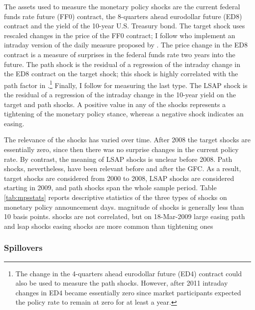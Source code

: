 {The assets used to measure the monetary policy shocks are the current federal funds rate future (FF0) contract, the 8-quarters ahead eurodollar future (ED8) contract and the yield of the 10-year U.S. Treasury bond.
The target shock uses rescaled changes in the price of the FF0 contract; I follow \cite{GSS:2005a} who implement an intraday version of the daily measure proposed by \cite{Kuttner:2001}.
The price change in the ED8 contract is a measure of surprises in the federal funds rate two years into the future.
The path shock is the residual of a regression of the intraday change in the ED8 contract on the target shock; this shock is highly correlated with the path factor in \cite{GSS:2005a}.\footnote{ The change in the 4-quarters ahead eurodollar future (ED4) contract could also be used to measure the path shocks. However, after 2011 intraday changes in ED4 became essentially zero since market participants expected the policy rate to remain at zero for at least a year.}
Finally, I follow \cite{Swanson:2018} for measuring the last type. %
The LSAP shock is the residual of a regression of the intraday change in the 10-year yield on the target and path shocks.
A positive value in any of the shocks represents a tightening of the monetary policy stance, whereas a negative shock indicates an easing.


The relevance of the shocks has varied over time.
After 2008 the target shocks are essentially zero, since then there was no surprise changes in the current policy rate.
By contrast, the meaning of LSAP shocks is unclear before 2008.
Path shocks, nevertheless, have been relevant before and after the GFC.
As a result, target shocks are considered from 2000 to 2008, LSAP shocks are considered starting in 2009, and path shocks span the whole sample period.
Table \ref{tab:mpsstats} reports descriptive statistics of the three types of shocks on monetary policy announcement days.
magnitude of shocks is generally less than 10 basis points.
shocks are not correlated, but on 18-Mar-2009 large easing path and lsap shocks
easing shocks are more common than tightening ones


\subsubsection{Spillovers} \label{sec:LPs}
\iftoggle{toclinks}{\gototoc}{} %

}
